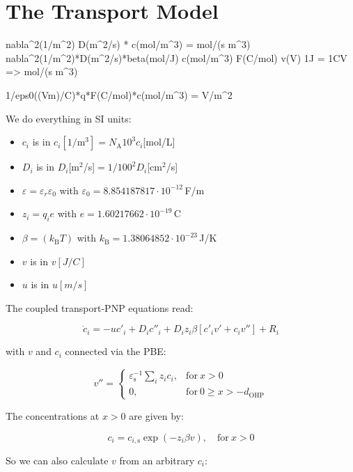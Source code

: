 \documentclass[10pt,a4paper]{article}
\begin{document}
\section{The Transport Model}

nabla^2(1/m^2) D(m^2/s) * c(mol/m^3) = mol/(s m^3) 
nabla^2(1/m^2)*D(m^2/s)*beta(mol/J) c(mol/m^3) F(C/mol) v(V) 
1J = 1CV
=> mol/(s m^3)

1/eps0((Vm)/C)*q*F(C/mol)*c(mol/m^3) = V/m^2

We do everything in SI units:

\begin{itemize}
\item $c_i$ is in $c_i[1/\mathrm{m}^3] = N_\mathrm{A} 10^3 c_i$[mol/L]
\item $D_i$ is in $D_i$[m$^2$/s]$ = 1/100^2 D_i$[cm$^2$/s]
\item $\varepsilon = \varepsilon_r \varepsilon_0$ with $\varepsilon_0 = 8.854187817\cdot 10^{-12}$\,F/m
\item $z_i = q_i e$ with $e = 1.60217662\cdot 10^{-19}$\,C
\item $\beta = (k_\mathrm{B}T)$ with $k_\mathrm{B} = 1.38064852\cdot 10^{-23}$\,J/K
\item $v$ is in $v[J/C]$
\item $u$ is in $u[m/s]$
\end{itemize}


The coupled transport-PNP equations read:

\begin{equation}
\dot{c}_i =  -u c'_i + D_i c''_i + D_i z_i \beta \left[c'_i v' + c_i v'' \right] + R_i
\end{equation}

with $v$ and $c_i$ connected via the PBE:

\begin{equation}
v'' = \left.
\begin{cases}
\varepsilon_\mathrm{s}^{-1} \sum\limits_i z_i c_i,& \mathrm{for}~ x > 0\\
0, & \mathrm{for}~ 0 \geq x > -d_\mathrm{OHP}
\end{cases}
\right.
\end{equation}

The concentrations at $x>0$ are given by:

\begin{equation}
c_i = c_{i,\mathrm{s}} \exp\left(-z_i \beta v\right), \quad \mathrm{for}~ x > 0
\end{equation}

So we can also calculate $v$ from an arbitrary $c_i$:
\end{document}
